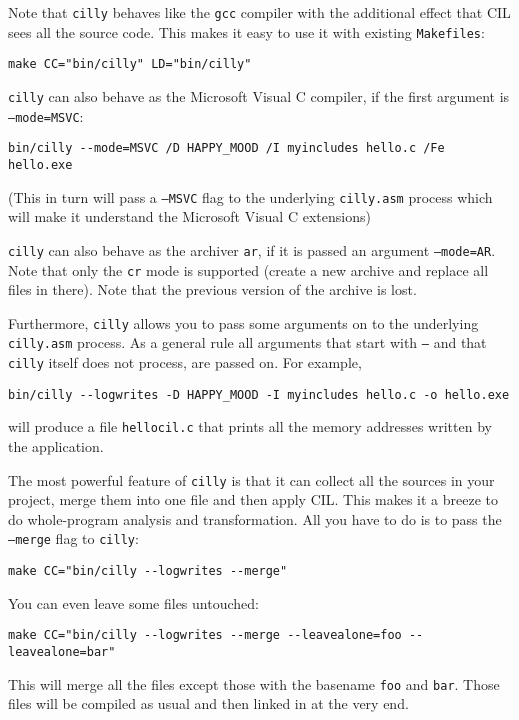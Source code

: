\documentclass{article}
\def\t#1{{\tt #1}}
\begin{document}
 Note that \t{cilly} behaves like the \t{gcc} compiler with the additional
effect that CIL sees all the source code. This makes it easy
to use it with existing \t{Makefiles}:
\begin{verbatim}
make CC="bin/cilly" LD="bin/cilly"
\end{verbatim}

 \t{cilly} can also behave as the Microsoft Visual C compiler, if the first
 argument is \t{--mode=MSVC}:
\begin{verbatim}
bin/cilly --mode=MSVC /D HAPPY_MOOD /I myincludes hello.c /Fe hello.exe
\end{verbatim}

 (This in turn will pass a \t{--MSVC} flag to the underlying \t{cilly.asm}
 process which will make it understand the Microsoft Visual C extensions)

 \t{cilly} can also behave as the archiver \t{ar}, if it is passed an
argument \t{--mode=AR}. Note that only the \t{cr} mode is supported (create a
new archive and replace all files in there). Note that the previous version of
the archive is lost. 

 Furthermore, \t{cilly} allows you to pass some arguments on to the
underlying \t{cilly.asm} process. As a general rule all arguments that start
with \t{--} and that \t{cilly} itself does not process, are passed on. For
example, 
\begin{verbatim}
bin/cilly --logwrites -D HAPPY_MOOD -I myincludes hello.c -o hello.exe
\end{verbatim}

 will produce a file \t{hellocil.c} that prints all the memory addresses
written by the application. 

 The most powerful feature of \t{cilly} is that it can collect all the
sources in your project, merge them into one file and then apply CIL. This
makes it a breeze to do whole-program analysis and transformation. All you
have to do is to pass the \t{--merge} flag to \t{cilly}:
\begin{verbatim}
make CC="bin/cilly --logwrites --merge"
\end{verbatim}

 You can even leave some files untouched:
\begin{verbatim}
make CC="bin/cilly --logwrites --merge --leavealone=foo --leavealone=bar"
\end{verbatim}

 This will merge all the files except those with the basename \t{foo} and
\t{bar}. Those files will be compiled as usual and then linked in at the very
end. 
\end{document}
